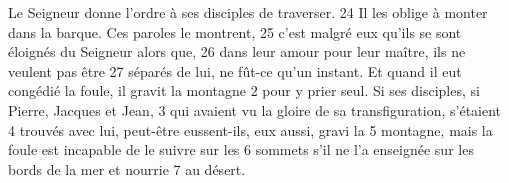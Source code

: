 Le Seigneur donne l'ordre à ses disciples de traverser.	 
24	 	Il les oblige à monter dans la barque. Ces paroles le montrent,	 
25	 	c'est malgré eux qu'ils se sont éloignés du Seigneur alors que,	 
26	 	dans leur amour pour leur maître, ils ne veulent pas être	 
27	 	séparés de lui, ne fût-ce qu'un instant.
Et quand il eut congédié la foule, il gravit la montagne	 
2	 	pour y prier seul. Si ses disciples, si Pierre, Jacques et Jean,	 
3	 	qui avaient vu la gloire de sa transfiguration, s'étaient	 
4	 	trouvés avec lui, peut-être eussent-ils, eux aussi, gravi la	 
5	 	montagne, mais la foule est incapable de le suivre sur les	 
6	 	sommets s'il ne l'a enseignée sur les bords de la mer et nourrie	 
7	 	au désert.